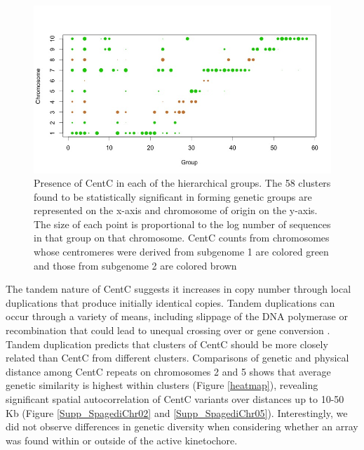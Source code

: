 \begin{figure}[h]
\centering
\includegraphics[width=1\textwidth]{Fig2_TWgroups}
\caption{Presence of CentC in each of the hierarchical groups.  The 58 clusters found to be statistically significant in forming genetic groups are represented on the x-axis and chromosome of origin on the y-axis. The size of each point is proportional to the log number of sequences in that group on that chromosome. CentC counts from chromosomes whose centromeres were derived from subgenome 1 are colored green and those from subgenome 2 are colored brown 
}
\label{pcoa}    
\end{figure}

The tandem nature of CentC suggests it increases in copy number through local duplications that produce initially identical copies.  
Tandem duplications can occur through a variety of means, including slippage of the DNA polymerase \citep{jeeeeeeff.} or recombination that could lead to unequal crossing over or gene conversion \citep{edlund1981recombination}.
Tandem duplication predicts that  clusters of CentC should be more closely related than CentC from different clusters.  
Comparisons of genetic and physical distance among CentC repeats on chromosomes 2 and 5 shows that average genetic similarity is highest within clusters (Figure \ref{heatmap}), revealing significant spatial autocorrelation of CentC variants over distances up to 10-50 Kb (Figure \ref{Supp_SpagediChr02} and \ref{Supp_SpagediChr05}).
Interestingly, we did not observe differences in genetic diversity when considering whether an array was found within or outside of the active kinetochore.

